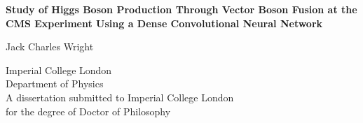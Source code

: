 
\begin{titlepage}
    \begin{center}
        \vspace*{2cm}
        
        \huge{\textbf{Study of Higgs Boson Production Through Vector Boson Fusion at the CMS Experiment Using a Dense Convolutional Neural Network}}

        \vspace{1.5cm}
        \normalsize
        Jack Charles Wright
        
        \vspace{0.5cm}
        Imperial College London\\
        Department of Physics\\

        \vspace{5cm}
        A dissertation submitted to Imperial College London\\
        for the degree of Doctor of Philosophy\\
        
    \end{center}
\end{titlepage}

